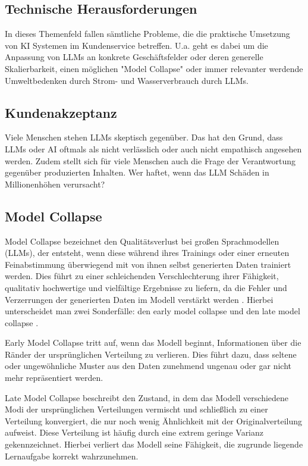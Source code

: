 \documentclass[12pt]{article}
\begin{document}
\subsection{Technische Herausforderungen}
In dieses Themenfeld fallen sämtliche Probleme, die die praktische Umsetzung von KI Systemen im Kundenservice betreffen. U.a. geht es dabei um die Anpassung von LLMs an konkrete Geschäftsfelder oder deren generelle Skalierbarkeit, einen möglichen "Model Collapse" oder immer relevanter werdende Umweltbedenken durch Strom- und Wasserverbrauch durch LLMs.

\subsection{Kundenakzeptanz}
Viele Menschen stehen LLMs skeptisch gegenüber. 
Das hat den Grund, dass LLMs oder AI oftmals als nicht verlässlich oder auch nicht empathisch angesehen werden.
Zudem stellt sich für viele Menschen auch die Frage der Verantwortung gegenüber produzierten Inhalten. Wer haftet, wenn das LLM Schäden in Millionenhöhen verursacht?

\subsection{Model Collapse}
Model Collapse bezeichnet den Qualitätsverlust bei großen Sprachmodellen (LLMs), der entsteht, wenn diese während ihres Trainings oder einer erneuten Feinabstimmung überwiegend mit von ihnen selbst generierten Daten trainiert werden. Dies führt zu einer schleichenden Verschlechterung ihrer Fähigkeit, qualitativ hochwertige und vielfältige Ergebnisse zu liefern, da die Fehler und Verzerrungen der generierten Daten im Modell verstärkt werden \cite{modelCollapse}.
Hierbei unterscheidet man zwei Sonderfälle: den early model collapse und den late model collapse \cite{shumailov2023curse}.

Early Model Collapse tritt auf, wenn das Modell beginnt, Informationen über die Ränder der ursprünglichen Verteilung zu verlieren. Dies führt dazu, dass seltene oder ungewöhnliche Muster aus den Daten zunehmend ungenau oder gar nicht mehr repräsentiert werden.

Late Model Collapse beschreibt den Zustand, in dem das Modell verschiedene Modi der ursprünglichen Verteilungen vermischt und schließlich zu einer Verteilung konvergiert, die nur noch wenig Ähnlichkeit mit der Originalverteilung aufweist. Diese Verteilung ist häufig durch eine extrem geringe Varianz gekennzeichnet. Hierbei verliert das Modell seine Fähigkeit, die zugrunde liegende Lernaufgabe korrekt wahrzunehmen.
\end{document}
